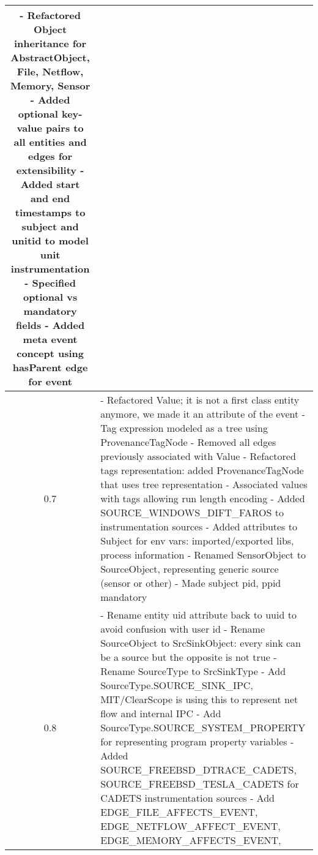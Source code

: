\documentclass[10pt, conference, onecolumn]{IEEEtran}
\begin{document}
\begin{longtable}{|c|p{17cm}|}
  - Refactored Object inheritance for AbstractObject, File, Netflow, Memory, Sensor  \newline
  - Added optional key-value pairs to all entities and edges for extensibility  \newline
  - Added start and end timestamps to subject and unitid to model unit instrumentation \newline
  - Specified optional vs mandatory fields \newline
  - Added meta event concept using hasParent edge for event
\\\hline
0.7 &  \small
  - Refactored Value; it is not a first class entity anymore, we made it an attribute of the event  \newline
  - Tag expression modeled as a tree using ProvenanceTagNode  \newline
  - Removed all edges previously associated with Value  \newline
  - Refactored tags representation: added ProvenanceTagNode that uses tree representation  \newline
  - Associated values with tags allowing run length encoding  \newline
  - Added SOURCE\_WINDOWS\_DIFT\_FAROS to instrumentation sources  \newline
  - Added attributes to Subject for env vars: imported/exported libs, process information  \newline
  - Renamed SensorObject to SourceObject, representing generic source (sensor or other)  \newline
  - Made subject pid, ppid mandatory 
\\\hline
0.8 & \small
  - Rename entity uid attribute back to uuid to avoid confusion with user id \newline
  - Rename SourceObject to SrcSinkObject: every sink can be a source but the opposite is not true \newline
  - Rename SourceType to SrcSinkType \newline
  - Add SourceType.SOURCE\_SINK\_IPC, MIT/ClearScope is using this to represent net flow and internal IPC \newline
  - Add SourceType.SOURCE\_SYSTEM\_PROPERTY for representing program property variables \newline
  - Added SOURCE\_FREEBSD\_DTRACE\_CADETS, SOURCE\_FREEBSD\_TESLA\_CADETS for CADETS instrumentation sources \newline
  - Add EDGE\_FILE\_AFFECTS\_EVENT, EDGE\_NETFLOW\_AFFECT\_EVENT, EDGE\_MEMORY\_AFFECTS\_EVENT, \newline

\end{longtable}
\end{document}
